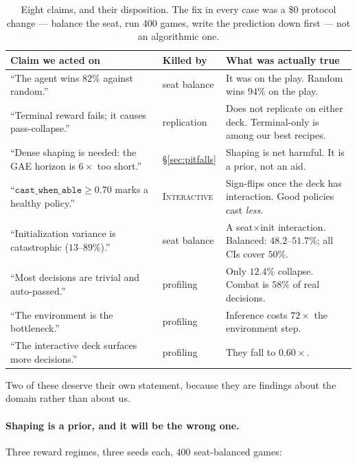 \documentclass[11pt]{article}
\newcommand{\intdeck}{\textsc{Interactive}}
\begin{document}
\begin{table}[H]
\centering\small
\begin{tabular}{p{6.2cm}p{2.1cm}p{5.4cm}}
\toprule
\textbf{Claim we acted on} & \textbf{Killed by} & \textbf{What was actually true} \\
\midrule
``The agent wins $82\%$ against random.'' & seat balance & It was on the play. Random wins $94\%$ on the play. \\
``Terminal reward fails; it causes pass-collapse.'' & replication & Does not replicate on either deck. Terminal-only is among our best recipes. \\
``Dense shaping is needed: the GAE horizon is $6\times$ too short.'' & \S\ref{sec:pitfalls} & Shaping is net harmful. It is a prior, not an aid. \\
``$\texttt{cast\_when\_able}\ge0.70$ marks a healthy policy.'' & \intdeck & Sign-flips once the deck has interaction. Good policies cast \emph{less}. \\
``Initialization variance is catastrophic ($13$--$89\%$).'' & seat balance & A seat$\times$init interaction. Balanced: $48.2$--$51.7\%$; all CIs cover $50\%$. \\
``Most decisions are trivial and auto-passed.'' & profiling & Only $12.4\%$ collapse. Combat is $58\%$ of real decisions. \\
``The environment is the bottleneck.'' & profiling & Inference costs $72\times$ the environment step. \\
``The interactive deck surfaces more decisions.'' & profiling & They fall to $0.60\times$. \\
\bottomrule
\end{tabular}
\caption{Eight claims, and their disposition. The fix in every case was a \$0 protocol change --- balance the seat, run 400 games, write the prediction down first --- not an algorithmic one.}
\label{tab:refuted}
\end{table}

Two of these deserve their own statement, because they are findings about the domain rather than about us.

\paragraph{Shaping is a prior, and it will be the wrong one.} Three reward regimes, three seeds each, 400 seat-balanced games:
\end{document}
